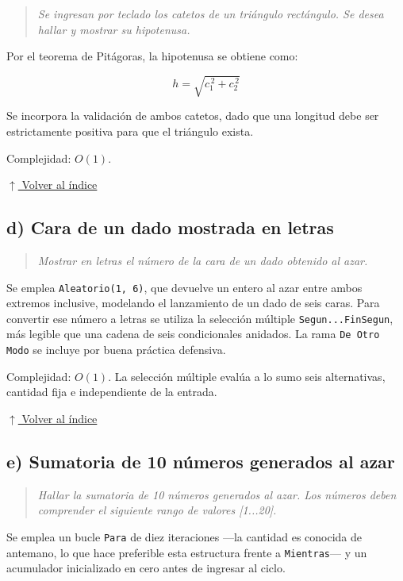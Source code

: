 \documentclass[12pt]{article}
\newcommand{\codigo}[1]{\texttt{\small #1}}
\newcommand{\pseudocodigo}[2]{%
}
\newcommand{\volverindice}{%
    \vspace{1em}%
    \begin{flushright}%
        \hyperlink{indice}{\small $\uparrow$ Volver al índice}%
    \end{flushright}%
}
\newcommand{\enunciado}[1]{%
    \begin{quote}
        \itshape #1
    \end{quote}
}
\begin{document}
\enunciado{Se ingresan por teclado los catetos de un triángulo rectángulo. Se desea hallar y mostrar su hipotenusa.}

Por el teorema de Pitágoras, la hipotenusa se obtiene como:

\[
h = \sqrt{c_1^{\,2} + c_2^{\,2}}
\]

Se incorpora la validación de ambos catetos, dado que una longitud debe ser estrictamente positiva para que el triángulo exista.

\pseudocodigo{ej08_c_hipotenusa}{Cálculo de la hipotenusa de un triángulo rectángulo}

Complejidad: $O(1)$.

\volverindice
\newpage

\subsection{d) Cara de un dado mostrada en letras}

\enunciado{Mostrar en letras el número de la cara de un dado obtenido al azar.}

Se emplea \codigo{Aleatorio(1, 6)}, que devuelve un entero al azar entre ambos extremos inclusive, modelando el lanzamiento de un dado de seis caras. Para convertir ese número a letras se utiliza la selección múltiple \codigo{Segun...FinSegun}, más legible que una cadena de seis condicionales anidados. La rama \codigo{De Otro Modo} se incluye por buena práctica defensiva.

\pseudocodigo{ej08_d_cara_dado_letras}{Cara de un dado al azar mostrada en letras}

Complejidad: $O(1)$. La selección múltiple evalúa a lo sumo seis alternativas, cantidad fija e independiente de la entrada.

\volverindice
\newpage

\subsection{e) Sumatoria de 10 números generados al azar}

\enunciado{Hallar la sumatoria de 10 números generados al azar. Los números deben comprender el siguiente rango de valores [1...20].}

Se emplea un bucle \codigo{Para} de diez iteraciones —la cantidad es conocida de antemano, lo que hace preferible esta estructura frente a \codigo{Mientras}— y un acumulador inicializado en cero antes de ingresar al ciclo.
\end{document}
